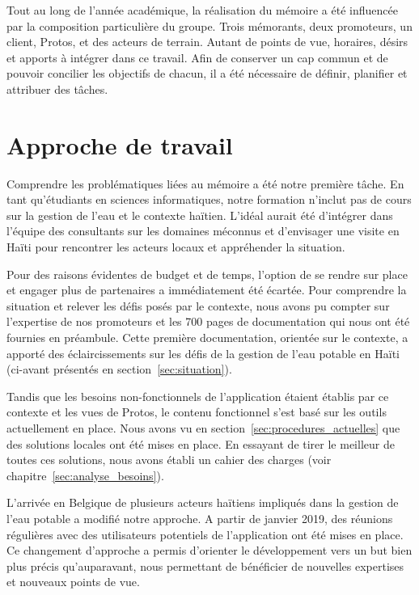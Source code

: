 \documentclass{EPL-master-thesis-covers-FR}
\begin{document}
		Tout au long de l'année académique, la réalisation du mémoire a été influencée par la composition particulière du groupe. Trois mémorants, deux promoteurs, un client, Protos, et des acteurs de terrain. Autant de points de vue, horaires, désirs et apports à intégrer dans ce travail. Afin de conserver un cap commun et de pouvoir concilier les objectifs de chacun, il a été nécessaire de définir, planifier et attribuer des tâches. %

		\section{Approche de travail}

			Comprendre les problématiques liées au mémoire a été notre première tâche. En tant qu'étudiants en sciences informatiques, notre formation n'inclut pas de cours sur la gestion de l'eau et le contexte haïtien. L'idéal aurait été d'intégrer dans l'équipe des consultants sur les domaines méconnus et d'envisager une visite en Haïti pour rencontrer les acteurs locaux et appréhender la situation.

			Pour des raisons évidentes de budget et de temps, l'option de se rendre sur place et engager plus de partenaires a immédiatement été écartée. Pour comprendre la situation et relever les défis posés par le contexte, nous avons pu compter sur l'expertise de nos promoteurs et les 700 pages de documentation qui nous ont été fournies en préambule. Cette première documentation, orientée sur le contexte, a apporté des éclaircissements sur les défis de la gestion de l'eau potable en Haïti (ci-avant présentés en section~\ref{sec:situation}).

			Tandis que les besoins non-fonctionnels de l'application étaient établis par ce contexte et les vues de Protos, le contenu fonctionnel s'est basé sur les outils actuellement en place. Nous avons vu en section~\ref{sec:procedures_actuelles} que des solutions locales ont été mises en place. En essayant de tirer le meilleur de toutes ces solutions, nous avons établi un cahier des charges (voir chapitre~\ref{sec:analyse_besoins}).

			L'arrivée en Belgique de plusieurs acteurs haïtiens impliqués dans la gestion de l'eau potable a modifié notre approche. A partir de janvier 2019, des réunions régulières avec des utilisateurs potentiels de l'application ont été mises en place. Ce changement d'approche a permis d'orienter le développement vers un but bien plus précis qu'auparavant, nous permettant de bénéficier de nouvelles expertises et nouveaux points de vue.
\end{document}
